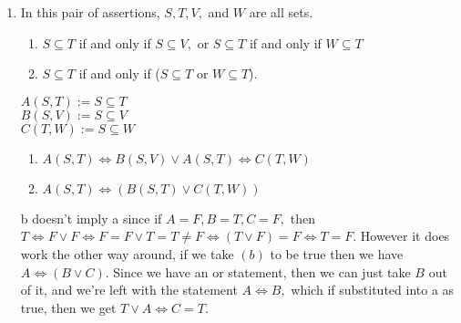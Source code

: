 \documentclass[12pt, letterpaper]{article}
\begin{document}
\begin{enumerate}
	
	\item In this pair of assertions, $S, T , V ,$ and $W$ are all sets. \begin{enumerate}
		\item $S \subseteq T$ if and only if $S \subseteq V,$ or $S \subseteq T$ if and only if $W \subseteq T$
		\item $S \subseteq T$ if and only if	($S \subseteq T$ or $W \subseteq T$).
	\end{enumerate}
	$A(S,T) := S \subseteq T$\\
	$B(S,V) := S \subseteq V$\\
	$C(T,W) := S \subseteq W$\\
	\begin{enumerate}
		\item $A(S,T) \Leftrightarrow B(S,V) \vee A(S,T) \Leftrightarrow C(T,W)$
		\item $A(S,T) \Leftrightarrow (B(S,T) \vee C(T,W))$
	\end{enumerate}
	b doesn't imply a since if $A = F, B = T, C = F,$ then $T \Leftrightarrow F \vee F \Leftrightarrow F = F \vee T = T \neq F \Leftrightarrow (T \vee F) = F \Leftrightarrow T = F.$  However it does work the other way around, if we take $(b)$ to be true then we have $A \Leftrightarrow (B \vee C).$  Since we have an or statement, then we can just take $B$ out of it, and we're left with the statement $A \Leftrightarrow B,$ which if substituted into a as true, then we get $T \vee A \Leftrightarrow C = T.$  
\end{enumerate}
 
 
\end{document}
